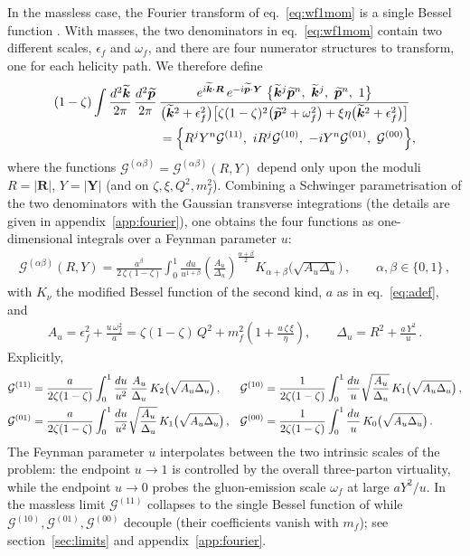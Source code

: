 \documentclass[11pt,a4paper]{article}
\newcommand{\calG}{\mathcal{G}}
\newcommand{\vR}{\bm{R}}
\newcommand{\vY}{\bm{Y}}
\newcommand{\kt}{\widetilde{\bm{k}}}
\newcommand{\pt}{\widetilde{\bm{p}}}
\newcommand{\eps}{\epsilon}
\numberwithin{equation}{section}
\begin{document}
In the massless case, the Fourier transform of eq.~\eqref{eq:wf1mom} is a single Bessel
function \cite{Iancu:2022gpw}. With masses, the two denominators in eq.~\eqref{eq:wf1mom}
contain two different scales, $\eps_f$ and $\omega_f$, and there are four numerator structures
to transform, one for each helicity path. We therefore define
\begin{align}
\label{eq:FTdef}
(1-\zeta) \int \frac{d^{2}\kt}{2\pi}\, \frac{d^{2}\pt}{2\pi}\,&
\frac{e^{i\kt\cdot \vR}\, e^{-i\pt\cdot \vY}\;
\big\{\kt^{j}\pt^{n},\ \kt^{j},\ \pt^{n},\ 1\big\}}
{\big(\kt^{2}+\eps^{2}_{f}\big) \big[\zeta(1-\zeta)^{2} \big(\pt^{2}+\omega_{f}^{2}\big)
+ \xi\eta\big(\kt^{2} + \eps^{2}_{f}\big)\big]} \notag\\
&= \Big\{R^{j}Y^{n}\calG^{(11)},\ iR^{j}\calG^{(10)},\ -iY^{n}\calG^{(01)},\ \calG^{(00)}\Big\},
\end{align}
where the functions $\calG^{(\alpha\beta)}=\calG^{(\alpha\beta)}(R,Y)$ depend only upon the
moduli $R=|\vR|$, $Y=|\vY|$ (and on $\zeta,\xi,Q^2,m_f^2$). Combining a Schwinger
parametrisation of the two denominators with the Gaussian transverse integrations (the details
are given in appendix~\ref{app:fourier}), one obtains the four functions as one-dimensional
integrals over a Feynman parameter $u$:
\begin{align}
\label{eq:Gab}
\boxed{\ \ \calG^{(\alpha\beta)}(R,Y) = \frac{a^{\beta}}{2\,\zeta(1-\zeta)}
\int_{0}^{1} \frac{du}{u^{1+\beta}}
\left(\frac{A_{u}}{\Delta_{u}}\right)^{\!\frac{\alpha + \beta}{2}}
K_{\alpha + \beta}\big(\sqrt{A_{u}\Delta_{u}}\big)\,,\qquad \alpha,\beta\in\{0,1\}\,,\ \ }
\end{align}
with $K_\nu$ the modified Bessel function of the second kind, $a$ as in eq.~\eqref{eq:adef},
and
\begin{align}
\label{eq:ADelta}
A_{u} = \eps^{2}_{f} + \frac{u\,\omega^{2}_{f}}{a} =
\zeta(1-\zeta)\,Q^{2} +m^{2}_{f}\left(1+\frac{u\,\zeta\,\xi}{\eta}\right),
\qquad
\Delta_{u} = R^{2} + \frac{a\,Y^{2}}{u}\,.
\end{align}
Explicitly,
\begin{align}
\label{eq:Gexplicit}
\calG^{(11)} &= \frac{a}{2\zeta(1-\zeta)} \int_{0}^{1} \frac{du}{u^{2}}\,
\frac{A_{u}}{\Delta_{u}}\,K_{2}\big(\sqrt{A_{u}\Delta_{u}}\big)\,, &
\calG^{(10)} &= \frac{1}{2\zeta(1-\zeta)} \int_{0}^{1} \frac{du}{u}
\sqrt{\frac{A_{u}}{\Delta_{u}}}\, K_{1}\big(\sqrt{A_{u}\Delta_{u}}\big)\,, \notag\\
\calG^{(01)} &= \frac{a}{2\zeta(1-\zeta)} \int_{0}^{1} \frac{du}{u^{2}}
\sqrt{\frac{A_{u}}{\Delta_{u}}}\, K_{1}\big(\sqrt{A_{u}\Delta_{u}}\big)\,, &
\calG^{(00)} &= \frac{1}{2\zeta(1-\zeta)} \int_{0}^{1} \frac{du}{u}\,
K_{0}\big(\sqrt{A_{u}\Delta_{u}}\big)\,.
\end{align}
The Feynman parameter $u$ interpolates between the two intrinsic scales of the problem: the
endpoint $u\to 1$ is controlled by the overall three-parton virtuality, while the endpoint
$u\to 0$ probes the gluon-emission scale $\omega_f$ at large $aY^2/u$. In the massless limit
$\calG^{(11)}$ collapses to the single Bessel function of \cite{Iancu:2022gpw} while
$\calG^{(10)},\calG^{(01)},\calG^{(00)}$ decouple (their coefficients vanish with $m_f$); see
section~\ref{sec:limits} and appendix~\ref{app:fourier}.
\end{document}

